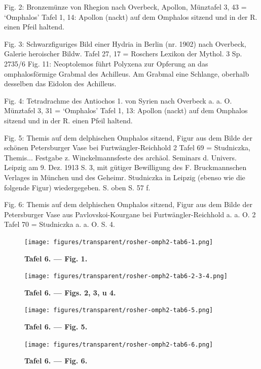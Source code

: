 \documentclass[a4paper, 11pt, oneside]{article}
\begin{document}
Fig. 2: Bronzemünze von Rhegion nach Overbeck, Apollon, Münztafel 3, 43 = `Omphalos' Tafel 1, 14: Apollon (nackt) auf dem Omphalos sitzend und in der R. einen Pfeil haltend.

Fig. 3: Schwarzfiguriges Bild einer Hydria in Berlin (nr. 1902) nach Overbeck, Galerie heroischer Bildw. Tafel 27, 17 = Roschers Lexikon der Mythol. 3 Sp. 2735/6 Fig. 11: Neoptolemos führt Polyxena zur Opferung an das omphalosförmige Grabmal des Achilleus. Am Grabmal eine Schlange, oberhalb desselben das Eidolon des Achilleus.

Fig. 4: Tetradrachme des Antiochos 1. von Syrien nach Overbeck a. a. O. Münztafel 3, 31 = `Omphalos' Tafel 1, 13: Apollon (nackt) auf dem Omphalos sitzend und in der R. einen Pfeil haltend.

Fig. 5: Themis auf dem delphischen Omphalos sitzend, Figur aus dem Bilde der schönen Petersburger Vase bei Furtwängler-Reichhold 2 Tafel 69 = Studniczka, Themis... Festgabe z. Winckelmannsfeste des archäol. Seminars d. Univers. Leipzig am 9. Dez. 1913 S. 3, mit gütiger Bewilligung des F. Bruckmannschen Verlages in München und des Geheimr. Studniczka in Leipzig (ebenso wie die folgende Figur) wiedergegeben. S. oben S. 57 f.

Fig. 6: Themis auf dem delphischen Omphalos sitzend, Figur aus dem Bilde der Petersburger Vase aus Pavlovskoi-Kourgane bei Furtwängler-Reichhold a. a. O. 2 Tafel 70 = Studniczka a. a. O. S. 4.
\clearpage
\begin{landscape}
\vspace*{\fill}
\begin{figure}[H]
\centering
\texttt{[image: figures/transparent/rosher-omph2-tab6-1.png]}
\caption{\bfseries Tafel 6. --- Fig. 1.}
\end{figure}
\vspace*{\fill}
\clearpage
\vspace*{\fill}
\begin{figure}[H]
\centering
\texttt{[image: figures/transparent/rosher-omph2-tab6-2-3-4.png]}
\caption{\bfseries Tafel 6. --- Figs. 2, 3, u 4.}
\end{figure}
\vspace*{\fill}
\clearpage
\end{landscape}
\vspace*{\fill}
\begin{figure}[H]
\centering
\texttt{[image: figures/transparent/rosher-omph2-tab6-5.png]}
\caption{\bfseries Tafel 6. --- Fig. 5.}
\end{figure}
\vspace*{\fill}
\clearpage
\vspace*{\fill}
\begin{figure}[H]
\centering
\texttt{[image: figures/transparent/rosher-omph2-tab6-6.png]}
\caption{\bfseries Tafel 6. --- Fig. 6.}
\end{figure}
\vspace*{\fill}
\clearpage
\end{document}
